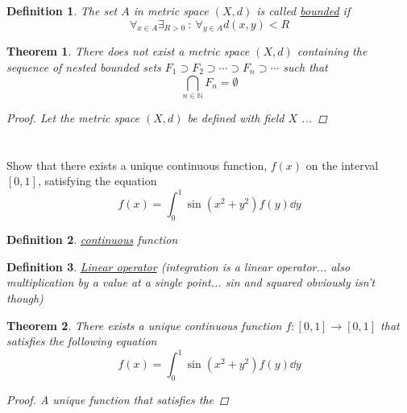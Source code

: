 \documentclass[]{article}
\newcommand{\N}{\mathbb{N}}
\newcommand{\st}{\ : \ }
\newtheorem{definition}{Definition}
\newtheorem{theorem}{Theorem}
\begin{document}
\begin{definition}
    The set $A$ in metric space $(X,d)$ is called \emph{\underline{bounded}} if
    \[
        \forall_{x \in A} \exists_{R>0} \st \forall_{y\in A} d(x,y) < R
    \]
\end{definition}

\begin{theorem}
    There does not exist a metric space $(X,d)$ 
    containing the sequence of nested bounded sets 
    $F_1 \supset F_2 \supset \cdots \supset F_n \supset \cdots$
    such that \[
        \bigcap_{n \in \N} F_n = \emptyset
    \]
    \begin{proof}
        Let the metric space $(X,d)$ be defined with field $X$ ...

















    \end{proof}
\end{theorem}




\newpage
\section{}
Show that there exists a unique continuous function, 
$f(x)$ on the interval $[0,1]$,
satisfying the equation
\[
    f(x) = \int_{0}^{1} \sin(x^2 + y^ 2) f(y) \dd y
\]


\begin{definition}
    \emph{\underline{continuous}} function
\end{definition}

\begin{definition}
    \emph{\underline{Linear operator}} (integration is a linear operator... also multiplication by a value at a single point... sin and squared obviously isn't though)
\end{definition}


\begin{theorem}
    There exists a unique continuous function $f : [0,1] \to [0,1]$
    that satisfies the following equation
    \begin{equation}\label{eq:pblm5}
        f(x) = \int_{0}^{1} \sin(x^2 + y^ 2) f(y) \dd y
    \end{equation}
    \begin{proof}
        A unique function that satisfies the
    \end{proof}
\end{theorem}
\end{document}
